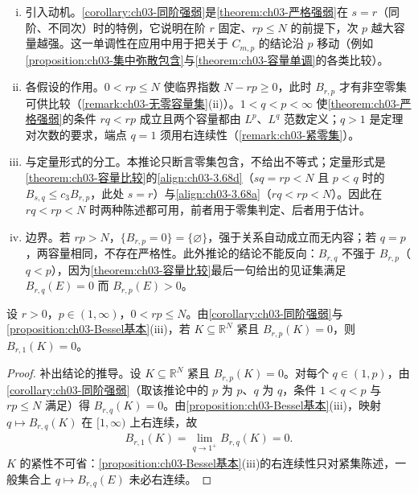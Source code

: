 \documentclass[../../main.tex]{subfiles}%
\begin{document}
\begin{remark}\label{remark:ch03-同阶强弱动机}
\begin{enumerate}[(i)]
\item 引入动机。\cref{corollary:ch03-同阶强弱}是\cref{theorem:ch03-严格强弱}在 $s=r$（同阶、不同次）时的特例，它说明在阶 $r$ 固定、$rp\leqslant N$ 的前提下，次 $p$ 越大容量越强。这一单调性在应用中用于把关于 $C_{m,p}$ 的结论沿 $p$ 移动（例如\cref{proposition:ch03-集中弥散包含}与\cref{theorem:ch03-容量单调}的各类比较）。
\item 各假设的作用。$0<rp\leqslant N$ 使临界指数 $N-rp\geqslant0$，此时 $B_{r,p}$ 才有非空零集可供比较（\cref{remark:ch03-无零容量集}(ii)）。$1<q<p<\infty$ 使\cref{theorem:ch03-严格强弱}的条件 $rq<rp$ 成立且两个容量都由 $L^p$、$L^q$ 范数定义；$q>1$ 是定理对次数的要求，端点 $q=1$ 须用右连续性（\cref{remark:ch03-紧零集}）。
\item 与定量形式的分工。本推论只断言零集包含，不给出不等式；定量形式是\cref{theorem:ch03-容量比较}的\eqref{align:ch03-3.68d}（$sq=rp<N$ 且 $p<q$ 时的 $B_{s,q}\leqslant c_3B_{r,p}$，此处 $s=r$）与\eqref{align:ch03-3.68a}（$rq<rp<N$）。因此在 $rq<rp<N$ 时两种陈述都可用，前者用于零集判定、后者用于估计。
\item 边界。若 $rp>N$，$\{B_{r,p}=0\}=\{\varnothing\}$，强于关系自动成立而无内容；若 $q=p$，两容量相同，不存在严格性。此外推论的结论不能反向：$B_{r,q}$ 不强于 $B_{r,p}$（$q<p$），因为\cref{theorem:ch03-容量比较}最后一句给出的见证集满足 $B_{r,q}(E)=0$ 而 $B_{r,p}(E)>0$。
\end{enumerate}
\end{remark}

\begin{remark}\label{remark:ch03-紧零集}
设 $r>0$，$p\in(1,\infty)$，$0<rp\leqslant N$。由\cref{corollary:ch03-同阶强弱}与\cref{proposition:ch03-Bessel基本}(iii)，若 $K\subseteq\mathbb{R}^N$ 紧且 $B_{r,p}(K)=0$，则 $B_{r,1}(K)=0$。
\end{remark}

\begin{proof}
补出结论的推导。设 $K\subseteq\mathbb{R}^N$ 紧且 $B_{r,p}(K)=0$。对每个 $q\in(1,p)$，由\cref{corollary:ch03-同阶强弱}（取该推论中的 $p$ 为 $p$、$q$ 为 $q$，条件 $1<q<p$ 与 $rp\leqslant N$ 满足）得 $B_{r,q}(K)=0$。由\cref{proposition:ch03-Bessel基本}(iii)，映射 $q\mapsto B_{r,q}(K)$ 在 $[1,\infty)$ 上右连续，故
\begin{align*}
B_{r,1}(K)=\lim_{q\to1^+}B_{r,q}(K)=0.
\end{align*}
$K$ 的紧性不可省：\cref{proposition:ch03-Bessel基本}(iii)的右连续性只对紧集陈述，一般集合上 $q\mapsto B_{r,q}(E)$ 未必右连续。
\end{proof}
\end{document}
